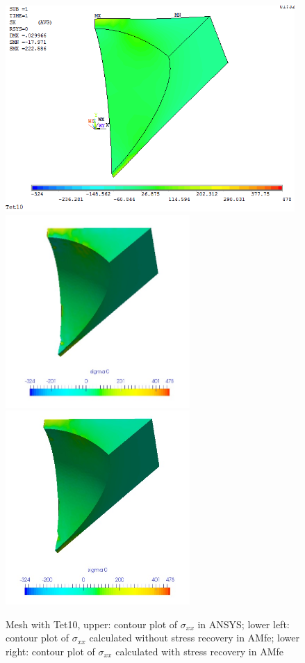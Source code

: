 \begin{figure}[htbp]
	\begin{center}
		\includegraphics[width=11cm,clip]{Tet10_Sxx.png} 	
		\includegraphics[width=7cm,clip]{Tet10_Sxx_PD.png} 			
		\includegraphics[width=7cm,clip]{Tet10_Sxx_P.png} 		
		\caption{Mesh with Tet10, upper: contour plot of $\sigma_{xx}$ in ANSYS; lower left: contour plot of $\sigma_{xx}$ calculated without stress recovery in AMfe; lower right: contour plot of $\sigma_{xx}$ calculated with stress recovery in AMfe} \label{fig: Tet10_Sxx}
	\end{center}
\end{figure}
\clearpage 

